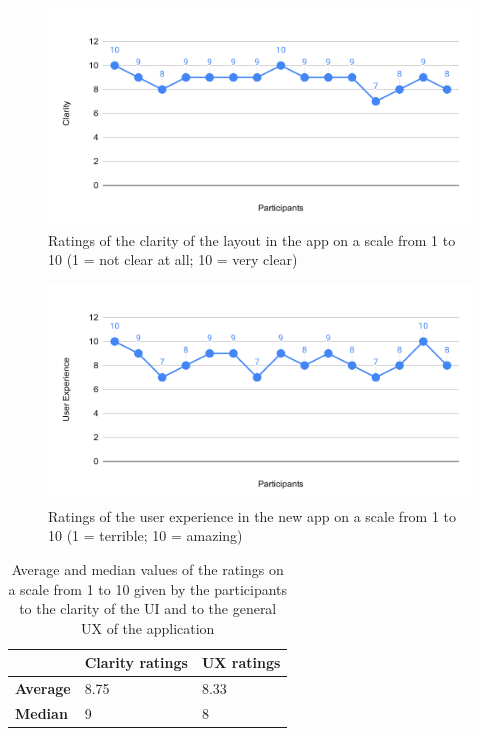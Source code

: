 \documentclass[]{usiinfbachelorproject}
\begin{document}
\begin{figure}[h!]
\centering
\includegraphics[scale=0.6]{figures/clarity-ratings.png}
\caption {Ratings of the clarity of the layout in the app on a scale from 1 to 10 (1 = not clear at all; 10 = very clear)}
\label{clarity}
\end{figure}

\begin{figure}[h!]
\centering
\includegraphics[scale=0.6]{figures/ux-ratings.png}
\caption {Ratings of the user experience in the new app on a scale from 1 to 10 (1 = terrible; 10 = amazing)}
\label{ux-ratings}
\end{figure}

\begin{table}[h!]
\centering
\begin{tabular}{|l|l|l|}
\hline
 & \textbf{Clarity ratings} & \textbf{UX ratings} \\ \hline
\textbf{Average} & 8.75 & 8.33 \\ \hline
\textbf{Median} & 9 & 8 \\ \hline
\end{tabular}
\caption{Average and median values of the ratings on a scale from 1 to 10 given by the participants to the clarity of the UI and to the general UX of the application}
\end{table}
\end{document}

